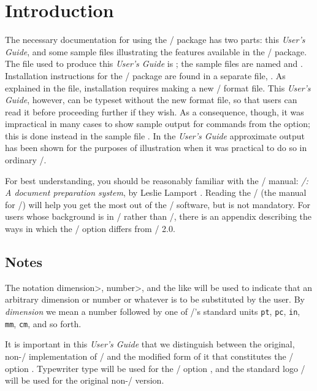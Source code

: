 \section{Introduction}

The necessary documentation for using the \amslatex/ package has two
parts: this {\em User's Guide\/}, and some sample files illustrating 
the features available in the
\amslatex/ package.  The file used to produce this {\it User's Guide}
is ; the sample files are named
 and .
Installation instructions for the
\amslatex/ package are found in a separate file, . 
As explained in the  file, installation requires
making a new \latex/ format file.
This {\em User's Guide}, however, 
can be typeset without the new format file,
so that users can read it before proceeding further if they wish.
As a consequence, though, it was
impractical in many cases to show sample output for commands from the
 option; this is done instead in the sample file
.  In the {\em User's Guide\/}
approximate output has been shown for the purposes
of illustration when it was practical to do so in ordinary \latex/.

For best understanding, you should be reasonably familiar with the
\latex/ manual: {\sl\latex/: A document preparation system}, by Leslie
Lamport \cite{lm}. Reading the \jt/ \cite{jt} (the manual for \amstex/)
will help you get the most out of the \amslatex/ software, but is not
mandatory. For users whose background is in \amstex/ rather than \latex/,
there is an appendix describing the ways in which the \latex/ 
option differs from \amstex/ 2.0.

\subsection{Notes}

The notation \<dimension>, \<number>, and the like will be used to
indicate that an arbitrary dimension or number or whatever
is to be substituted by the user.  By {\it dimension\/} we mean a number
followed by one of \tex/'s standard units {\tt pt}, {\tt pc},
{\tt in}, {\tt mm}, {\tt cm}, and so forth.

It is important in this {\it User's Guide} that we distinguish between the
original, non-\latex/ implementation of \amstex/ and the modified form
of it that constitutes the \latex/ option .
Typewriter type will be used for the \latex/ option
, and the standard logo \amstex/ will be used for the
original non-\latex/ version.

